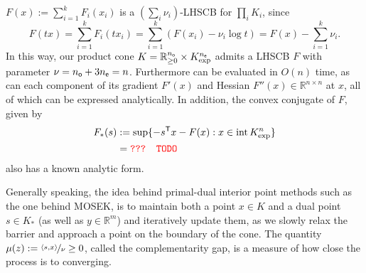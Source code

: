 \documentclass[twoside]{article}
\begin{document}
\begin{lproof}
    $F(x) := \sum_{i=1}^k F_i(x_i)$ is a $(\sum_i \nu_i)$-LHSCB for $\prod_i K_i$,
    since
    \[
        F(tx) = \sum_{i=1}^k F_i(t x_i)
            = \sum_{i=1}^k ( F(x_i) - \nu_i \log t)
            = F(x) - \sum_{i=1}^k \nu_i.
    \]
    In this way, our product cone $K = \mathbb R_{\ge 0}^{n_{\sf o}} \times K^{n_{\sf e}}_{\exp}$ admits a LHSCB $F$ with parameter $\nu = n_{\sf o} + 3 n_{\sf e} = n$. 
    Furthermore can be evaluated in $O(n)$ time, as can each component of
    its gradient $F'(x)$ and Hessian $F''(x) \in \mathbb R^{n \times n}$ at $x$, all of which can be expressed analytically.
    In addition, the convex conjugate of $F$, given by 
    \begin{align*}
        F_*(s) &:=  
        \sup\{ - s^{\sf T} x- F(x) : x \in \mathrm{int}\, K_{\exp}^n \}
            \\
        &= \color{red} \texttt{??? TODO}
    \end{align*}
    also has a known analytic form.
    
    
    Generally speaking, 
    the idea behind primal-dual interior point methods \parencite{nesterov1994book} such as the one behind MOSEK, is 
    to maintain both a point $x \in K$ and a dual point $s \in K_*$ (as well as $y \in \mathbb R^m$)
    and iteratively update them, as we slowly relax the barrier and approach a point on the boundary of the cone. 
    The quantity $\mu(z) := \nicefrac{\langle s, x \rangle}{\nu} \ge 0$, called the complementarity gap, is a measure of how close the process is to converging. 
    

\end{lproof}
\end{document}
